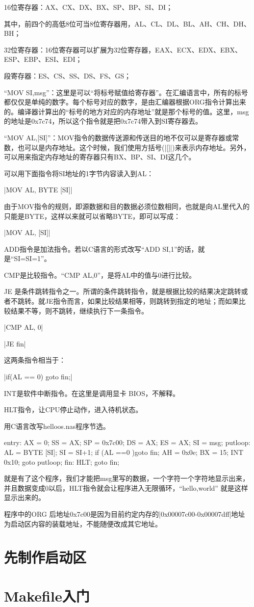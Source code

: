 16位寄存器：AX、CX、DX、BX、SP、BP、SI、DI；

其中，前四个的高低8位可当8位寄存器用，AL、CL、DL、BL、AH、CH、DH、BH；

32位寄存器：16位寄存器可以扩展为32位寄存器，EAX、ECX、EDX、EBX、ESP、EBP、ESI、EDI；

段寄存器：ES、CS、SS、DS、FS、GS；
\cs

“MOV SI,msg”：这里是可以“将标号赋值给寄存器”。在汇编语言中，所有的标号都仅仅是单纯的数字。每个标号对应的数字，是由汇编器根据ORG指令计算出来的。编译器计算出的“标号的地方对应的内存地址”就是那个标号的值。这里，msg的地址是0x7c74，所以这个指令就是把0x7c74带入到SI寄存器去。

“MOV AL,[SI]”：MOV指令的数据传送源和传送目的地不仅可以是寄存器或常数，也可以是内存地址。这个时候，我们使用方括号(|[]|)来表示内存地址。另外，可以用来指定内存地址的寄存器只有BX、BP、SI、DI这几个。

可以用下面指令将SI地址的1字节内容读入到AL：

|MOV AL, BYTE [SI]|

由于MOV指令的规则，即源数据和目的数据必须位数相同，也就是向AL里代入的只能是BYTE，这样以来就可以省略BYTE，即可以写成：

|MOV AL, [SI]|
\cs

ADD指令是加法指令。若以C语言的形式改写“ADD SI,1”的话，就是“SI=SI=1”。

CMP是比较指令。“CMP AL,0”，是将AL中的值与0进行比较。

JE 是条件跳转指令之一。所谓的条件跳转指令，就是根据比较的结果决定跳转或者不跳转。就JE指令而言，如果比较结果相等，则跳转到指定的地址；而如果比较结果不等，则不跳转，继续执行下一条指令。

|CMP AL, 0|

|JE fin|

这两条指令相当于：

|if(AL == 0){ goto fin;}|
\cs

INT是软件中断指令。在这里是调用显卡 BIOS，不解释。
\cs

HLT指令，让CPU停止动作，进入待机状态。
\cs

用C语言改写helloos.nas程序节选。
\begin{code}
entry:
	AX = 0;
	SS = AX;
	SP = 0x7c00;
	DS = AX;
	ES = AX;
	SI = msg;
putloop:
	AL = BYTE [SI];
	SI = SI+1;
	if (AL ==0 ){goto fin;}
	AH = 0x0e;
	BX = 15;
	INT 0x10;
	goto putloop;
fin:
	HLT;
	goto fin;
\end{code}

就是有了这个程序，我们才能把msg里写的数据，一个字符一个字符地显示出来，并且数据变成0以后，HLT指令就会让程序进入无限循环，“hello,world” 就是这样显示出来的。

\cs

程序中的ORG 后地址0x7c00是因为目前约定内存的|0x00007c00-0x00007dff|地址为启动区内容的装载地址，不能随便改成其它地址。

\section{	先制作启动区	}
\section{	Makefile入门	}

